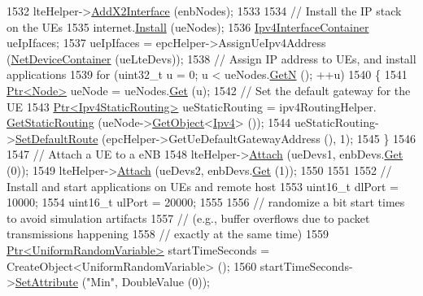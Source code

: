 \begin{DoxyCode}
1532   lteHelper->\hyperlink{classns3_1_1LteHelper_adbbd435f439200097e88a2965668bc26}{AddX2Interface} (enbNodes);
1533 
1534   \textcolor{comment}{// Install the IP stack on the UEs}
1535   internet.\hyperlink{classns3_1_1InternetStackHelper_a6645b412f31283d2d9bc3d8a95cebbc0}{Install} (ueNodes);
1536   \hyperlink{classns3_1_1Ipv4InterfaceContainer}{Ipv4InterfaceContainer} ueIpIfaces;
1537   ueIpIfaces = epcHelper->AssignUeIpv4Address (\hyperlink{classns3_1_1NetDeviceContainer}{NetDeviceContainer} (ueLteDevs));
1538   \textcolor{comment}{// Assign IP address to UEs, and install applications}
1539   \textcolor{keywordflow}{for} (uint32\_t u = 0; u < ueNodes.\hyperlink{classns3_1_1NodeContainer_aed647ac56d0407a7706aba02eb44b951}{GetN} (); ++u)
1540     \{
1541       \hyperlink{classns3_1_1Ptr}{Ptr<Node>} ueNode = ueNodes.\hyperlink{classns3_1_1NodeContainer_a9ed96e2ecc22e0f5a3d4842eb9bf90bf}{Get} (u);
1542       \textcolor{comment}{// Set the default gateway for the UE}
1543       \hyperlink{classns3_1_1Ptr}{Ptr<Ipv4StaticRouting>} ueStaticRouting = ipv4RoutingHelper.
      \hyperlink{classns3_1_1Ipv4StaticRoutingHelper_a731206e50d305695dac7fb2ef963a4bb}{GetStaticRouting} (ueNode->\hyperlink{classns3_1_1Object_a13e18c00017096c8381eb651d5bd0783}{GetObject}<\hyperlink{classns3_1_1Ipv4}{Ipv4}> ());
1544       ueStaticRouting->\hyperlink{classns3_1_1Ipv4StaticRouting_aee30fa3246c2b42f122dabdff2725331}{SetDefaultRoute} (epcHelper->GetUeDefaultGatewayAddress (), 1);
1545     \}
1546 
1547   \textcolor{comment}{// Attach a UE to a eNB}
1548   lteHelper->\hyperlink{classns3_1_1LteHelper_a9466743f826aa2652a87907b7f0a1c87}{Attach} (ueDevs1, enbDevs.\hyperlink{classns3_1_1NetDeviceContainer_a677d62594b5c9d2dea155cc5045f4d0b}{Get} (0));
1549   lteHelper->\hyperlink{classns3_1_1LteHelper_a9466743f826aa2652a87907b7f0a1c87}{Attach} (ueDevs2, enbDevs.\hyperlink{classns3_1_1NetDeviceContainer_a677d62594b5c9d2dea155cc5045f4d0b}{Get} (1));
1550 
1551 
1552   \textcolor{comment}{// Install and start applications on UEs and remote host}
1553   uint16\_t dlPort = 10000;
1554   uint16\_t ulPort = 20000;
1555 
1556   \textcolor{comment}{// randomize a bit start times to avoid simulation artifacts}
1557   \textcolor{comment}{// (e.g., buffer overflows due to packet transmissions happening}
1558   \textcolor{comment}{// exactly at the same time)}
1559   \hyperlink{classns3_1_1Ptr}{Ptr<UniformRandomVariable>} startTimeSeconds = 
      CreateObject<UniformRandomVariable> ();
1560   startTimeSeconds->\hyperlink{classns3_1_1ObjectBase_ac60245d3ea4123bbc9b1d391f1f6592f}{SetAttribute} (\textcolor{stringliteral}{"Min"}, DoubleValue (0));

\end{DoxyCode}
